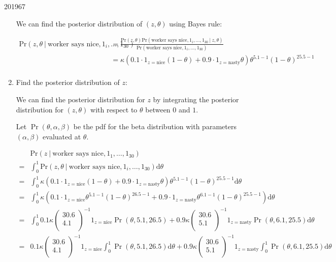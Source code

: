 \documentclass[10pt,\jkfside,a4paper]{article}
\begin{document}
\begin{examquestion}{2019}{6}{7}
\begin{enumerate}[label=(\alph*)]
We can find the posterior distribution of $(z, \theta)$ using Bayes rule:

\[
\begin{split}
\text{Pr}(z, \theta \ | \ \text{worker says nice}, 1_i, \dots, 1_{30})
&= \frac{\text{Pr}(z, \theta)\text{Pr}(\text{worker says nice}, 1_i, \dots, 1_{30} \ | \ z,
\theta)}{\text{Pr}(\text{worker says nice}, 1_i, \dots, 1_{30})} \\
&= \kappa \left(0.1\cdot 1_{z=\text{nice}}(1 - \theta) + 0.9\cdot
1_{z=\text{nasty}}\theta\right)\theta^{5.1 - 1}(1 - \theta)^{25.5 - 1} \\
\end{split}
\]

\item Find the posterior distribution of $z$:

We can find the posterior distribution for $z$ by integrating the posterior
distribution for $(z, \theta)$ with respect to $\theta$ between $0$ and $1$.

Let $\Pr(\theta, \alpha, \beta)$ be the pdf for the beta distribution with
parameters $(\alpha, \beta)$ evaluated at $\theta$.

\[
\begin{split}
& \text{Pr}(z \ | \ \text{worker says nice}, 1_1, \dots, 1_{30}) \\
=& \int^{1}_{0} \text{Pr}(z, \theta \ | \ \text{worker says nice}, 1_i,
\dots, 1_{30}) \text{d}\theta \\
=& \int^{1}_{0} \kappa \left(0.1\cdot 1_{z=\text{nice}}(1 - \theta) + 0.9\cdot
1_{z=\text{nasty}}\theta\right)\theta^{5.1 - 1}(1 -
\theta)^{25.5 - 1} \text{d}\theta \\
=& \int^{1}_{0} \kappa \left(0.1\cdot 1_{z=\text{nice}}\theta^{5.1 - 1}(1 -
\theta)^{26.5 - 1} + 0.9\cdot 1_{z=\text{nasty}}\theta^{6.1 - 1}(1 -\theta)
^{25.5 - 1}\right)\text{d}\theta \\
=& \int^{1}_{0} 0.1\kappa\begin{pmatrix}
30.6 \\ 4.1 \\ \end{pmatrix}^{-1} 1_{z=\text{nice}}\Pr(\theta, 5.1, 26.5) +
0.9\kappa \begin{pmatrix}
30.6 \\ 5.1 \\ \end{pmatrix}^{-1}1_{z=\text{nasty}}\Pr(\theta, 6.1, 25.5)
\text{d}\theta \\
=& 0.1\kappa\begin{pmatrix} 30.6 \\ 4.1 \\ \end{pmatrix}^{-1}
1_{z=\text{nice}}\int^{1}_{0}\Pr(\theta, 5.1, 26.5)\text{d}\theta + 0.9\kappa\begin{pmatrix}
30.6 \\ 5.1 \\ \end{pmatrix}^{-1}1_{z=\text{nasty}}\int^{1}_{0}\Pr(\theta, 6.1,
25.5)\text{d}\theta \\
\end{split}
\]


\end{enumerate}
\end{examquestion}
\end{document}
